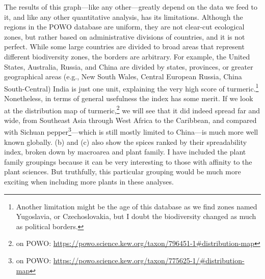 The results of this graph---like any other---greatly depend on the data we feed to it, and like any other quantitative analysis, has its limitations. Although the regions in the \gls{POWO} database are uniform, they are not clear-cut ecological zones, but rather based on administrative divisions of countries, and it is not perfect. While some large countries are divided to broad areas that represent different biodiversity zones, the borders are arbitrary. For example, the United States, Australia, Russia, and China are divided by states, provinces, or greater geographical areas (e.g., New South Wales, Central European Russia, China South-Central) India is just one unit, explaining the very high score of turmeric.\footnote{Another limitation might be the age of this database as we find zones named Yugoslavia, or Czechoslovakia, but I doubt the biodiversity changed as much as political borders.} Nonetheless, in terms of general usefulness the index has some merit. If we look at the distribution map of turmeric,\footnote{ on \gls{POWO}: \url{https://powo.science.kew.org/taxon/796451-1\#distribution-map}} we will see that it did indeed spread far and wide, from Southeast Asia through West Africa to the Caribbean, and compared with Sichuan pepper\footnote{ on \gls{POWO}: \url{https://powo.science.kew.org/taxon/775625-1/\#distribution-map}}---which is still mostly limited to China---is much more well known globally.  (b) and (c) also show the spices ranked by their spreadability index, broken down by macroarea and plant family. I have included the plant family groupings because it can be very interesting to those with affinity to the plant sciences. But truthfully, this particular grouping would be much more exciting when including more plants in these analyses. 




